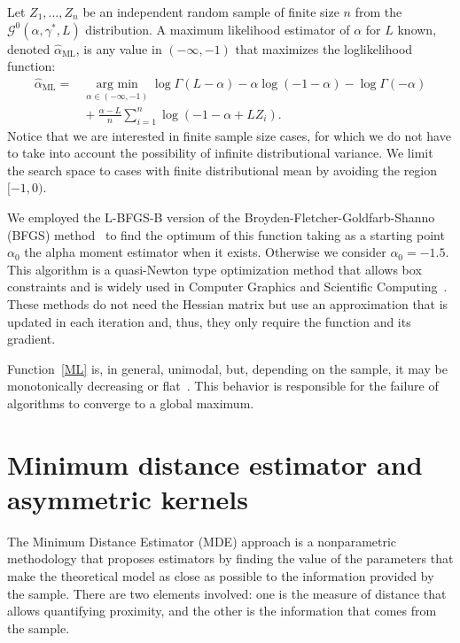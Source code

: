 \documentclass[twocolumn]{svjour3}
\newcommand{\argmin}{\operatorname*{\text{arg min }}}
\begin{document}
Let $Z_1,\dots, Z_n$ be an independent random sample of finite size $n$ from the $\mathcal G^0(\alpha,\gamma^*,L)$ distribution.
A maximum likelihood estimator of $\alpha$ for $L$ known, denoted $\widehat\alpha_{\text{{ML}}}$, is any value in $(-\infty,-1)$ that maximizes the loglikelihood function:
\begin{align}
\hat{\alpha}_{\text{{ML}}}=&\argmin_{\alpha \in (-\infty,-1)}\log \Gamma(L-\alpha)-
\alpha\log(-1-\alpha)-\log\Gamma(-\alpha) \nonumber \\
&\mbox{}+\frac{\alpha-L}{n} \sum_{i=1}^n\log(-1-\alpha+L Z_i).
\label{ML}
\end{align}
Notice that we are interested in finite sample size cases, for which we do not have to take into account the possibility of infinite distributional variance.
We limit the search space to cases with finite distributional mean by avoiding the region $[-1,0)$.

We employed the L-BFGS-B version of the Broyden-Fletcher-Goldfarb-Shanno (BFGS) method~\cite{Luenberger2008} to find the optimum of this function taking as a starting point $\alpha_0$ the alpha moment estimator when it exists. Otherwise we consider $\alpha_0=-1.5$. This algorithm is a quasi-Newton type optimization method that allows box constraints and is widely used in Computer Graphics and Scientific Computing~\cite{FEI2014}. 
These methods do not need the Hessian matrix but use an approximation that is updated in each iteration and, thus, they only require the function and its gradient. 

Function~\eqref{ML} is, in general, unimodal, but, depending on the sample, it may be monotonically decreasing or flat~\cite{FreryCribariSouza:JASP:04}. 
This behavior is responsible for the failure of algorithms to converge to a global maximum.


\section{Minimum distance estimator and asymmetric kernels}
\label{distancekernel}

The Minimum Distance Estimator (MDE) approach is a nonparametric methodology that proposes estimators by finding the value of the parameters that make the theoretical model as close as possible to the information provided by the sample. 
There are two elements involved: one is the measure of distance that allows quantifying proximity, and the other is the information that comes from the sample.
\end{document}
